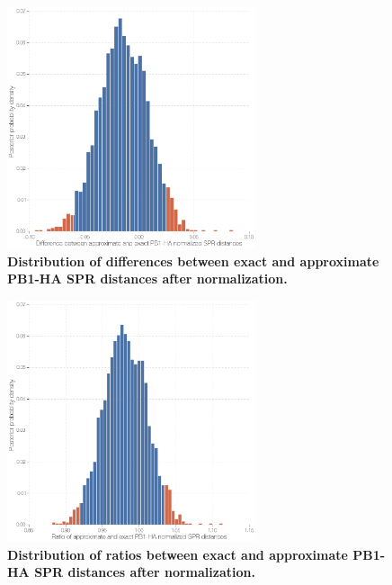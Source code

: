 \documentclass[11pt,oneside,letterpaper]{article}
\begin{document}
\begin{figure}
\centering  
\includegraphics[width=0.65\textwidth]  {supp_figures/InfB_supp_NormPB1-HA_hist.png}
\caption{\textbf{Distribution of differences between exact and approximate PB1-HA SPR distances after normalization.}}
\label{NormSPR_PB1-HA_difference}
\end{figure}

\begin{figure}
\centering  
\includegraphics[width=0.65\textwidth]  {supp_figures/InfB_supp_NormPB1-HA_hist2.png}
\caption{\textbf{Distribution of ratios between exact and approximate PB1-HA SPR distances after normalization.}}
\label{NormSPR_PB1-HA_ratio}
\end{figure}
\end{document}

